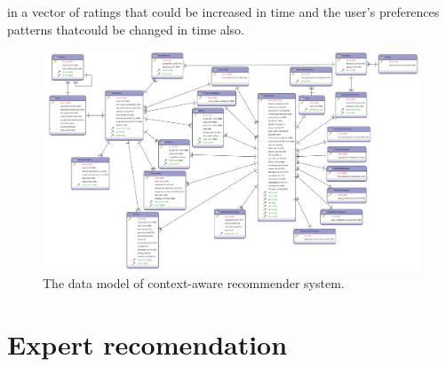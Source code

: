 in a vector of ratings that could be increased in time and  
the user's preferences patterns thatcould be changed in time also.
\begin{landscape} 
\begin{figure}[!h] 
\captionsetup{font=footnotesize}
\centering
\includegraphics[width=1.3\textwidth]{img/recomet.png}
\caption{The data model of context-aware recommender system.}
\label{fig:datamodel}    
\end{figure}
\end{landscape}

\section{Expert recomendation} 

